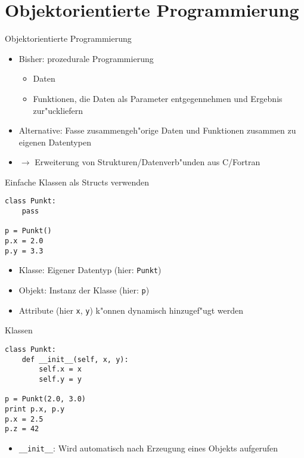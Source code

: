 \section{Objektorientierte Programmierung}

\begin{frame}{Objektorientierte Programmierung}
\begin{itemize}
\item Bisher: \alert{prozedurale Programmierung}
\begin{itemize}
\item Daten
\item Funktionen, die Daten als Parameter entgegennehmen und Ergebnis zur"uckliefern
\end{itemize}
\item Alternative: Fasse zusammengeh"orige Daten und Funktionen zusammen zu \alert{eigenen Datentypen}
\item $\rightarrow$ Erweiterung von Strukturen/Datenverb"unden aus C/Fortran
\end{itemize}
\end{frame}

\begin{frame}[fragile]{Einfache Klassen als Structs verwenden}
\begin{lstlisting}[style=Python]
class Punkt:
    pass

p = Punkt()
p.x = 2.0
p.y = 3.3
\end{lstlisting}
\begin{itemize}
\item \alert{Klasse}: Eigener Datentyp (hier: \texttt{Punkt})
\item \alert{Objekt}: Instanz der Klasse (hier: \texttt{p})
\item Attribute (hier \texttt{x}, \texttt{y})  k"onnen dynamisch hinzugef"ugt werden
\end{itemize}
\end{frame}

\begin{frame}[fragile]{Klassen}
\begin{lstlisting}[style=Python]
class Punkt:
    def __init__(self, x, y):
        self.x = x
        self.y = y

p = Punkt(2.0, 3.0)
print p.x, p.y
p.x = 2.5
p.z = 42
\end{lstlisting}
\begin{itemize}
\item \texttt{\_\_init\_\_}: Wird automatisch nach Erzeugung eines Objekts aufgerufen
\end{itemize}
\end{frame}

